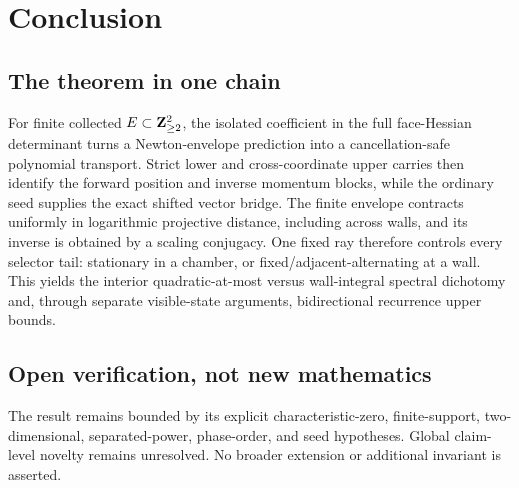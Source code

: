 \documentclass[11pt]{article}
\theoremstyle{definition}
\theoremstyle{remark}
\begin{document}
\section{Conclusion}

\subsection{The theorem in one chain}

For finite collected \(E\subset\mathbf{Z}_{\geq2}^2\), the isolated coefficient in
the full face-Hessian determinant turns a Newton-envelope prediction into
a cancellation-safe polynomial transport.  Strict lower and
cross-coordinate upper carries then identify the forward position and
inverse momentum blocks, while the ordinary seed supplies the exact
shifted vector bridge.  The finite envelope contracts uniformly in
logarithmic projective distance, including across walls, and its inverse
is obtained by a scaling conjugacy.  One fixed ray therefore controls
every selector tail: stationary in a chamber, or fixed/adjacent-alternating
at a wall.  This yields the interior quadratic-at-most versus wall-integral
spectral dichotomy and, through separate visible-state arguments,
bidirectional recurrence upper bounds.

\subsection{Open verification, not new mathematics}

The result remains bounded by its explicit characteristic-zero,
finite-support, two-dimensional, separated-power, phase-order, and seed
hypotheses.  Global claim-level novelty remains unresolved.  No broader
extension or additional invariant is asserted.



\end{document}
